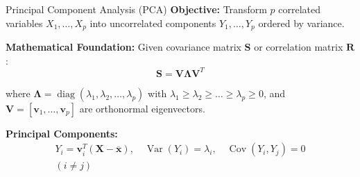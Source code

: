\documentclass[aspectratio=169,ignorenonframetext]{beamer}
\begin{document}
\begin{frame}{Principal Component Analysis (PCA)}
\textbf{Objective:} Transform \(p\) correlated variables
\(X_{1},\ldots,X_{p}\) into uncorrelated components
\(Y_{1},\ldots,Y_{p}\) ordered by variance.

\textbf{Mathematical Foundation:} Given covariance matrix \(\mathbf{S}\)
or correlation matrix \(\mathbf{R}\):
\[\mathbf{S} = \mathbf{V}\mathbf{\Lambda}\mathbf{V}^{T}\]

where
\(\mathbf{\Lambda} = \operatorname{diag}(\lambda_{1},\lambda_{2},\ldots,\lambda_{p})\)
with
\(\lambda_{1} \geq \lambda_{2} \geq \ldots \geq \lambda_{p} \geq 0\),
and
\(\mathbf{V} = \left\lbrack \mathbf{v}_{1},\ldots,\mathbf{v}_{p} \right\rbrack\)
are orthonormal eigenvectors.

\textbf{Principal Components:} \[\begin{array}{r}
Y_{i} = \mathbf{v}_{i}^{T}\left( \mathbf{X} - \overline{\mathbf{x}} \right),\quad\operatorname{Var}(Y_{i}) = \lambda_{i},\quad\operatorname{Cov}(Y_{i},Y_{j}) = 0 \\
(i \neq j)
\end{array}\]
\end{frame}
\end{document}
